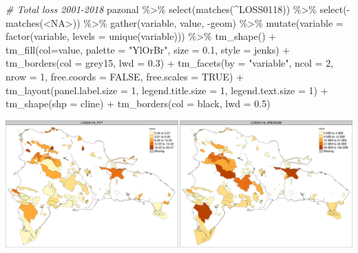 \documentclass[10pt,landscape,a3paper]{article}
\newenvironment{Shaded}{\begin{snugshade}}{\end{snugshade}}
\newcommand{\AttributeTok}[1]{\textcolor[rgb]{0.77,0.63,0.00}{#1}}
\newcommand{\CommentTok}[1]{\textcolor[rgb]{0.56,0.35,0.01}{\textit{#1}}}
\newcommand{\ConstantTok}[1]{\textcolor[rgb]{0.00,0.00,0.00}{#1}}
\newcommand{\DecValTok}[1]{\textcolor[rgb]{0.00,0.00,0.81}{#1}}
\newcommand{\FloatTok}[1]{\textcolor[rgb]{0.00,0.00,0.81}{#1}}
\newcommand{\FunctionTok}[1]{\textcolor[rgb]{0.00,0.00,0.00}{#1}}
\newcommand{\NormalTok}[1]{#1}
\newcommand{\SpecialCharTok}[1]{\textcolor[rgb]{0.00,0.00,0.00}{#1}}
\newcommand{\StringTok}[1]{\textcolor[rgb]{0.31,0.60,0.02}{#1}}
\begin{document}
\begin{Shaded}
\begin{Highlighting}[]

\CommentTok{\# Total loss 2001{-}2018}
\NormalTok{pazonal }\SpecialCharTok{\%\textgreater{}\%} \FunctionTok{select}\NormalTok{(}\FunctionTok{matches}\NormalTok{(}\StringTok{\textquotesingle{}\^{}LOSS0118\textquotesingle{}}\NormalTok{)) }\SpecialCharTok{\%\textgreater{}\%} \FunctionTok{select}\NormalTok{(}\SpecialCharTok{{-}}\FunctionTok{matches}\NormalTok{(}\StringTok{\textquotesingle{}\textless{}NA\textgreater{}\textquotesingle{}}\NormalTok{)) }\SpecialCharTok{\%\textgreater{}\%} 
  \FunctionTok{gather}\NormalTok{(variable, value, }\SpecialCharTok{{-}}\NormalTok{geom) }\SpecialCharTok{\%\textgreater{}\%}
  \FunctionTok{mutate}\NormalTok{(}\AttributeTok{variable =} \FunctionTok{factor}\NormalTok{(variable, }\AttributeTok{levels =} \FunctionTok{unique}\NormalTok{(variable))) }\SpecialCharTok{\%\textgreater{}\%} 
  \FunctionTok{tm\_shape}\NormalTok{() }\SpecialCharTok{+}
  \FunctionTok{tm\_fill}\NormalTok{(}\AttributeTok{col=}\StringTok{\textquotesingle{}value\textquotesingle{}}\NormalTok{, }\AttributeTok{palette =} \StringTok{"YlOrBr"}\NormalTok{, }\AttributeTok{size =} \FloatTok{0.1}\NormalTok{, }\AttributeTok{style =} \StringTok{\textquotesingle{}jenks\textquotesingle{}}\NormalTok{) }\SpecialCharTok{+}
  \FunctionTok{tm\_borders}\NormalTok{(}\AttributeTok{col =} \StringTok{\textquotesingle{}grey15\textquotesingle{}}\NormalTok{, }\AttributeTok{lwd =} \FloatTok{0.3}\NormalTok{) }\SpecialCharTok{+}
  \FunctionTok{tm\_facets}\NormalTok{(}\AttributeTok{by =} \StringTok{"variable"}\NormalTok{, }\AttributeTok{ncol =} \DecValTok{2}\NormalTok{, }\AttributeTok{nrow =} \DecValTok{1}\NormalTok{, }\AttributeTok{free.coords =} \ConstantTok{FALSE}\NormalTok{, }\AttributeTok{free.scales =} \ConstantTok{TRUE}\NormalTok{) }\SpecialCharTok{+}
  \FunctionTok{tm\_layout}\NormalTok{(}\AttributeTok{panel.label.size =} \DecValTok{1}\NormalTok{, }\AttributeTok{legend.title.size =} \DecValTok{1}\NormalTok{, }\AttributeTok{legend.text.size =} \DecValTok{1}\NormalTok{) }\SpecialCharTok{+} 
  \FunctionTok{tm\_shape}\NormalTok{(}\AttributeTok{shp =}\NormalTok{ cline) }\SpecialCharTok{+} \FunctionTok{tm\_borders}\NormalTok{(}\AttributeTok{col =} \StringTok{\textquotesingle{}black\textquotesingle{}}\NormalTok{, }\AttributeTok{lwd =} \FloatTok{0.5}\NormalTok{)}
\end{Highlighting}
\end{Shaded}

\begin{center}\includegraphics{img/zonal-pa-6} \end{center}
\end{document}
